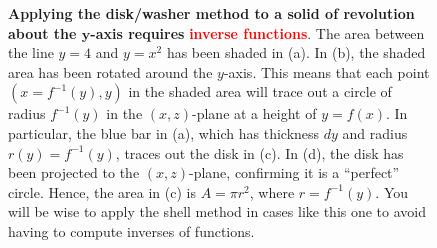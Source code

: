 \begin{figure}[hbt]%
\centering
{}%
%
\hfill %
%
	\centering
{}%
    \caption[]{\textbf{Applying the disk/washer method to a solid of revolution about the $\bm{y}$-axis requires} \textcolor{red}{\bf inverse functions}. The area between the line $y=4$ and $y=x^2$ has been shaded in (a). In (b), the shaded area has been rotated around the $y$-axis. This means that each point $(x=f^{-1}(y), y)$ in the shaded area will trace out a circle of radius $f^{-1}(y)$ in the $(x,z)$-plane at a height of $y=f(x)$. In particular, the blue bar in (a), which has thickness $dy$ and radius $r(y) = f^{-1}(y)$, traces out the disk in (c). In (d), the disk has been projected to the $(x, z)$-plane, confirming it is a ``perfect'' circle. Hence, the area in (c) is $A = \pi r^2$, where $r = f^{-1}(y)$. You will be wise to apply the shell method in cases like this one to avoid having to compute inverses of functions. }
    \label{fig:SimpleSolidRevolution}
\end{figure}



